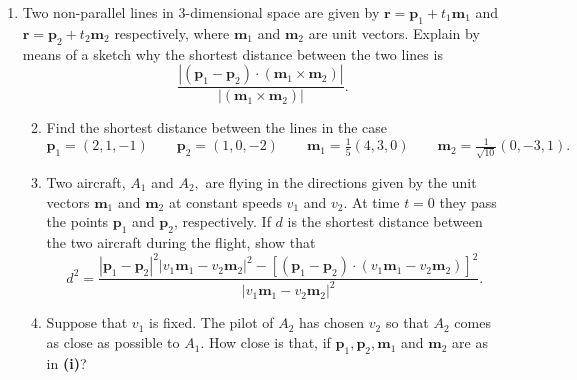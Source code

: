 \documentclass[a4, 11pt]{report}
\newlength{\qspace}
\newcounter{qnumber}
\newenvironment{question}%
 {\vspace{\qspace}
  \begin{enumerate}[\bfseries 1\quad][10]%
    \setcounter{enumi}{\value{qnumber}}%
    \item%
 }
{
  \end{enumerate}
  \filbreak
  \stepcounter{qnumber}
 }
\newenvironment{questionparts}[1][1]%
 {
  \begin{enumerate}[\bfseries (i)]%
    \setcounter{enumii}{#1}
    \addtocounter{enumii}{-1}
    \setlength{\itemsep}{5mm}
    \setlength{\parskip}{8pt}
 }
 {
  \end{enumerate}
 }
\begin{document}
\begin{question}
Two non-parallel lines in 3-dimensional space are given by $\mathbf{r}=\mathbf{p}_{1}+t_{1}\mathbf{m}_{1}$
and $\mathbf{r}=\mathbf{p}_{2}+t_{2}\mathbf{m}_{2}$ respectively,
where $\mathbf{m}_{1}$ and $\mathbf{m}_{2}$ are unit vectors. Explain
by means of a sketch why the shortest distance between the two lines
is 
\[
\frac{\left|(\mathbf{p}_{1}-\mathbf{p}_{2})\cdot(\mathbf{m}_{1}\times\mathbf{m}_{2})\right|}{\left|(\mathbf{m}_{1}\times\mathbf{m}_{2})\right|}.
\]


\begin{questionparts}
\item Find the shortest distance between the lines in the case 
\[
\mathbf{p}_{1}=(2,1,-1)\qquad\mathbf{p}_{2}=(1,0,-2)\qquad\mathbf{m}_{1}=\tfrac{1}{5}(4,3,0)\qquad\mathbf{m}_{2}=\tfrac{1}{\sqrt{10}}(0,-3,1).
\]

\item Two aircraft, $A_{1}$ and $A_{2},$ are flying in the directions
given by the unit vectors $\mathbf{m}_{1}$ and $\mathbf{m}_{2}$
at constant speeds $v_{1}$ and $v_{2}.$ At time $t=0$ they pass
the points $\mathbf{p}_{1}$ and $\mathbf{p}_{2}$, respectively.
If $d$ is the shortest distance between the two aircraft during the
flight, show that 
\[
d^{2}=\frac{\left|\mathbf{p}_{1}-\mathbf{p}_{2}\right|^{2}\left|v_{1}\mathbf{m}_{1}-v_{2}\mathbf{m}_{2}\right|^{2}-[(\mathbf{p}_{1}-\mathbf{p}_{2})\cdot(v_{1}\mathbf{m}_{1}-v_{2}\mathbf{m}_{2})]^{2}}{\left|v_{1}\mathbf{m}_{1}-v_{2}\mathbf{m}_{2}\right|^{2}}.
\]

\item Suppose that $v_{1}$ is fixed. The pilot of $A_{2}$ has chosen $v_{2}$
so that $A_{2}$ comes as close as possible to $A_{1}.$ How close
is that, if $\mathbf{p}_{1},\mathbf{p}_{2},\mathbf{m}_{1}$ and $\mathbf{m}_{2}$
are as in \textbf{(i)}?
\end{questionparts}
	\end{question}
\end{document}
